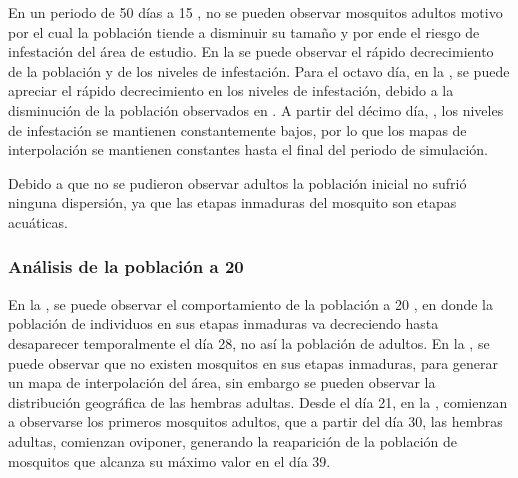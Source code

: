 En un periodo de 50 días a 15 \textcelsius, no se pueden observar mosquitos adultos motivo por el
cual la población tiende a disminuir su tamaño y por ende el riesgo de infestación del área de
estudio. En la  se puede observar el rápido decrecimiento de la
población y de los niveles de infestación. Para el octavo día, en la
, se puede apreciar el rápido decrecimiento en los niveles de
infestación, debido a la disminución de la población observados en
. A partir del décimo día,
, los niveles de infestación se mantienen constantemente
bajos, por lo que los mapas de interpolación se mantienen constantes hasta el final del periodo de
simulación.

Debido a que no se pudieron observar adultos la población inicial no sufrió ninguna dispersión, ya
que las etapas inmaduras del mosquito son etapas acuáticas.

\subsubsection{Análisis de la población a 20\textcelsius}
En la , se puede observar el comportamiento de la población a
20 \textcelsius, en donde la población de individuos en sus etapas inmaduras va decreciendo hasta
desaparecer temporalmente el día 28, no así la población de adultos. En la
, se puede observar que no existen mosquitos en sus etapas
inmaduras, para generar un mapa de interpolación del área, sin embargo se pueden observar la
distribución geográfica de las hembras adultas. Desde el día 21, en la
, comienzan a observarse los primeros mosquitos adultos, que a
partir del día 30, las hembras adultas, comienzan oviponer, generando la reaparición de la
población de mosquitos que alcanza su máximo valor en el día 39.

